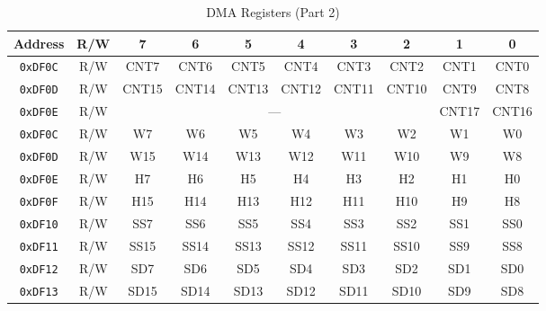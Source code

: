 \begin{table}[ht]
    \begin{center}
        \begin{tabular}{|c|c|c|c|c|c|c|c|c|c|} \hline
            Address & R/W & 7 & 6 & 5 & 4 & 3 & 2 & 1 & 0 \\\hline\hline
            \verb+0xDF0C+ & R/W & CNT7 & CNT6 & CNT5 & CNT4 & CNT3 & CNT2 & CNT1 & CNT0 \\ \hline
            \verb+0xDF0D+ & R/W & CNT15 & CNT14 & CNT13 & CNT12 & CNT11 & CNT10 & CNT9 & CNT8 \\ \hline
            \verb+0xDF0E+ & R/W & \multicolumn{6}{|c|}{---} & CNT17 & CNT16 \\ \hline\hline

            \verb+0xDF0C+ & R/W & W7 & W6 & W5 & W4 & W3 & W2 & W1 & W0 \\ \hline
            \verb+0xDF0D+ & R/W & W15 & W14 & W13 & W12 & W11 & W10 & W9 & W8 \\ \hline
            \verb+0xDF0E+ & R/W & H7 & H6 & H5 & H4 & H3 & H2 & H1 & H0 \\ \hline
            \verb+0xDF0F+ & R/W & H15 & H14 & H13 & H12 & H11 & H10 & H9 & H8 \\ \hline\hline

            \verb+0xDF10+ & R/W & SS7 & SS6 & SS5 & SS4 & SS3 & SS2 & SS1 & SS0 \\ \hline
            \verb+0xDF11+ & R/W & SS15 & SS14 & SS13 & SS12 & SS11 & SS10 & SS9 & SS8 \\ \hline

            \verb+0xDF12+ & R/W & SD7 & SD6 & SD5 & SD4 & SD3 & SD2 & SD1 & SD0 \\ \hline
            \verb+0xDF13+ & R/W & SD15 & SD14 & SD13 & SD12 & SD11 & SD10 & SD9 & SD8 \\ \hline
        \end{tabular}
    \end{center}
    \caption{DMA Registers (Part 2)}
    \label{tab:dma_reg_2}
\end{table}


